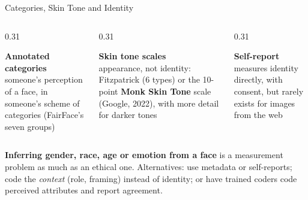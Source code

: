 \begin{frame}{Categories, Skin Tone and Identity}
\begin{columns}[T]
\begin{column}{0.31\textwidth}
\begin{graybox}[height=3.7cm]
\raggedright\textbf{Annotated categories}\\
someone's perception of a face, in someone's scheme of categories (FairFace's seven groups)
\end{graybox}
\end{column}
\begin{column}{0.31\textwidth}
\begin{greenbox}[height=3.7cm]
\raggedright\textbf{Skin tone scales}\\
appearance, not identity: Fitzpatrick (6 types) or the 10-point \textbf{Monk Skin Tone} scale
(Google, 2022), with more detail for darker tones
\end{greenbox}
\end{column}
\begin{column}{0.31\textwidth}
\begin{navybox}[height=3.7cm]
\raggedright\textbf{Self-report}\\
measures identity directly, with consent, but rarely exists for images from the web
\end{navybox}
\end{column}
\end{columns}

\vspace{0.2cm}
\begin{warnbox}
\textbf{Inferring gender, race, age or emotion from a face} is a measurement problem as much as an
ethical one. Alternatives: use metadata or self-reports; code the \emph{context} (role, framing)
instead of identity; or have trained coders code perceived attributes and report agreement.
\end{warnbox}
\end{frame}

